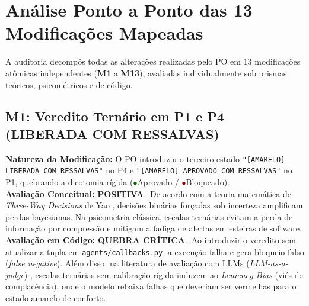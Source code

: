\documentclass[11pt,a4paper]{article}
\newcommand{\cVerde}{\textcolor{DarkGreen}{\ensuremath{\bullet}\;}}
\newcommand{\cVermelho}{\textcolor{DarkRed}{\ensuremath{\bullet}\;}}
\begin{document}
\section{Análise Ponto a Ponto das 13 Modificações Mapeadas}

A auditoria decompôs todas as alterações realizadas pelo PO em 13 modificações atômicas independentes (\textbf{M1} a \textbf{M13}), avaliadas individualmente sob prismas teóricos, psicométricos e de código.

\subsection{M1: Veredito Ternário em P1 e P4 (LIBERADA COM RESSALVAS)}
\textbf{Natureza da Modificação:} O PO introduziu o terceiro estado \texttt{"[AMARELO] LIBERADA COM RESSALVAS"} no P4 e \texttt{"[AMARELO] APROVADO COM RESSALVAS"} no P1, quebrando a dicotomia rígida (\cVerde Aprovado / \cVermelho Bloqueado).\\
\textbf{Avaliação Conceitual:} \color{DarkGreen}\textbf{POSITIVA}.\normalfont\ De acordo com a teoria matemática de \textit{Three-Way Decisions} de Yao \cite{yao2010three}, decisões binárias forçadas sob incerteza amplificam perdas bayesianas. Na psicometria clássica, escalas ternárias evitam a perda de informação por compressão e mitigam a fadiga de alertas em esteiras de software.\\
\textbf{Avaliação em Código:} \color{DarkRed}\textbf{QUEBRA CRÍTICA}.\normalfont\ Ao introduzir o veredito sem atualizar a tupla em \texttt{agents/callbacks.py}, a execução falha e gera bloqueio falso (\textit{false negative}). Além disso, na literatura de avaliação com LLMs (\textit{LLM-as-a-judge}) \cite{shinn2023reflexion}, escalas ternárias sem calibração rígida induzem ao \textit{Leniency Bias} (viés de complacência), onde o modelo rebaixa falhas que deveriam ser vermelhas para o estado amarelo de conforto.
\end{document}
